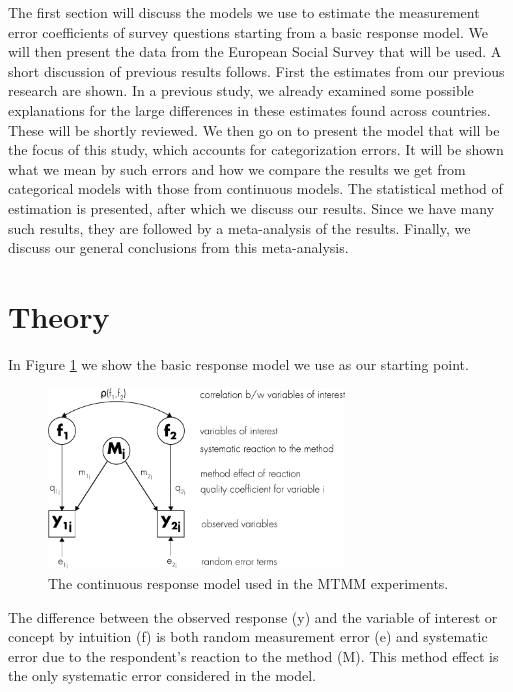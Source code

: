 \documentclass[a4paper,12pt]{article}
\begin{document}
The first section will discuss the models we use to estimate the measurement error coefficients of survey questions starting from a basic response model. We will then present the data from the European Social Survey that will be used. A short discussion of previous results follows. First the estimates from our previous research are shown. In a previous study, we already examined some possible explanations for the large differences in these estimates found across countries. These will be shortly reviewed. We then go on to present the model that will be the focus of this study, which accounts for categorization errors. It will be shown what we mean by such errors and how we compare the results we get from categorical models with those from continuous models. The statistical method of estimation is presented, after which we discuss our results. Since we have many such results, they are followed by a meta-analysis of the results. Finally, we discuss our general conclusions from this meta-analysis.


\section{Theory}

In Figure \ref{fig:response} we show the basic response model \citep{Saris_design_2007} we use as our starting point. 

\begin{figure}[htb]
\centering
\includegraphics[width=0.7\textwidth]{i/response_model_continuous}
\caption{The continuous response model used in the MTMM experiments.\label{fig:response}}
\end{figure}

The difference between the observed response (y) and the variable of interest or concept by intuition (f) is both random measurement error (e) and systematic error due to the respondent's reaction to the method (M). This method effect is the only systematic error considered in the model.
\end{document}
